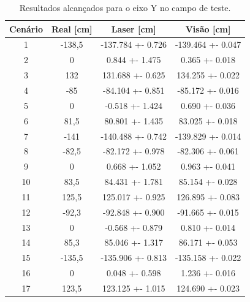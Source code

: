 \documentclass[acronym, symbols, table, deposito]{fei}
\begin{document}
				\begin{table}[!htb]
					\centering
					\caption{Resultados alcançados para o eixo Y no campo de teste.}
					\label{tbl:general_results_y}
					\begin{tabular}{|c|
							>{\columncolor[HTML]{A6C9EC}}c |
							>{\columncolor[HTML]{A6C9EC}}c |
							>{\columncolor[HTML]{A6C9EC}}c |}
						\hline
						Cenário                    & Real {[}cm{]}   & Laser {[}cm{]}    & Visão {[}cm{]}    \\ \hline
						\cellcolor[HTML]{FFFFFF}1  & -138,5          & -137.784 +- 0.726 & -139.464 +- 0.047 \\ \hline
						\cellcolor[HTML]{FFFFFF}2  & 0               & 0.844 +- 1.475    & 0.365 +- 0.018    \\ \hline
						\cellcolor[HTML]{FFFFFF}3  & 132             & 131.688 +- 0.625  & 134.255 +- 0.022  \\ \hline
						\cellcolor[HTML]{FFFFFF}4  & -85             & -84.104 +- 0.851  & -85.172 +- 0.016  \\ \hline
						\cellcolor[HTML]{FFFFFF}5  & 0               & -0.518 +- 1.424   & 0.690 +- 0.036    \\ \hline
						\cellcolor[HTML]{FFFFFF}6  & 81,5            & 80.801 +- 1.435   & 83.025 +- 0.018   \\ \hline
						\cellcolor[HTML]{FFFFFF}7  & -141            & -140.488 +- 0.742 & -139.829 +- 0.014 \\ \hline
						\cellcolor[HTML]{FFFFFF}8  & -82,5           & -82.172 +- 0.978  & -82.306 +- 0.061  \\ \hline
						\cellcolor[HTML]{FFFFFF}9  & 0               & 0.668 +- 1.052    & 0.963 +- 0.041    \\ \hline
						\cellcolor[HTML]{FFFFFF}10 & 83,5            & 84.431 +- 1.781   & 85.154 +- 0.028   \\ \hline
						\cellcolor[HTML]{FFFFFF}11 & 125,5           & 125.017 +- 0.925  & 126.895 +- 0.083  \\ \hline
						\cellcolor[HTML]{FFFFFF}12 & -92,3           & -92.848 +- 0.900  & -91.665 +- 0.015  \\ \hline
						\cellcolor[HTML]{FFFFFF}13 & 0               & -0.568 +- 0.879   & 0.810 +- 0.014    \\ \hline
						\cellcolor[HTML]{FFFFFF}14 & 85,3            & 85.046 +- 1.317   & 86.171 +- 0.053   \\ \hline
						\cellcolor[HTML]{FFFFFF}15 & -135,5          & -135.906 +- 0.813 & -135.158 +- 0.022 \\ \hline
						\cellcolor[HTML]{FFFFFF}16 & 0               & 0.048 +- 0.598    & 1.236 +- 0.016    \\ \hline
						\cellcolor[HTML]{FFFFFF}17 & 123,5           & 123.125 +- 1.015  & 124.690 +- 0.023  \\ \hline
					\end{tabular}
				\end{table}
			
\end{document}
